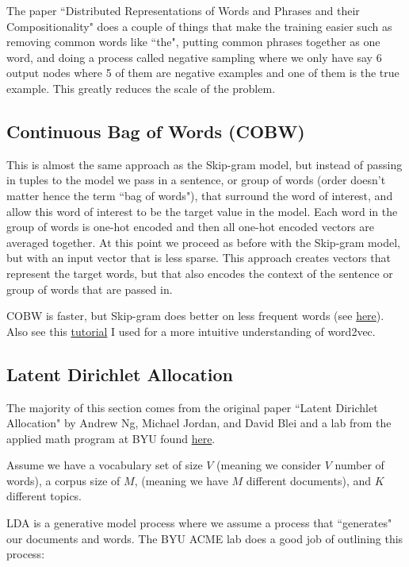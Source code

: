 The paper ``Distributed Representations of Words and Phrases and their Compositionality" does a couple of things that make the training easier such as removing common words like ``the", putting common phrases together as one word, and doing a process called negative sampling where we only have say 6 output nodes where 5 of them are negative examples and one of them is the true example. This greatly reduces the scale of the problem.

\subsection{Continuous Bag of Words (COBW)}

This is almost the same approach as the Skip-gram model, but instead of passing in tuples to the model we pass in a sentence, or group of words (order doesn't matter hence the term ``bag of words"), that surround the word of interest, and allow this word of interest to be the target value in the model. Each word in the group of words is one-hot encoded and then all one-hot encoded vectors are averaged together. At this point we proceed as before with the Skip-gram model, but with an input vector that is less sparse. This approach creates vectors that represent the target words, but that also encodes the context of the sentence or group of words that are passed in. 

COBW is faster, but Skip-gram does better on less frequent words (see \href{https://code.google.com/archive/p/word2vec/}{here}). Also see this \href{http://mccormickml.com/2016/04/19/word2vec-tutorial-the-skip-gram-model/}{tutorial} I used for a more intuitive understanding of word2vec.

\subsection{Latent Dirichlet Allocation}

The majority of this section comes from the original paper ``Latent Dirichlet Allocation" by Andrew Ng, Michael Jordan, and David Blei and a lab from the applied math program at BYU found \href{http://acme.byu.edu/wp-content/uploads/2019/01/GibbsSampling.pdf}{here}.

Assume we have a vocabulary set of size $V$ (meaning we consider $V$ number of words), a corpus size of $M$, (meaning we have $M$ different documents), and $K$ different topics. 

LDA is a generative model process where we assume a process that ``generates" our documents and words. The BYU ACME lab does a good job of outlining this process:

